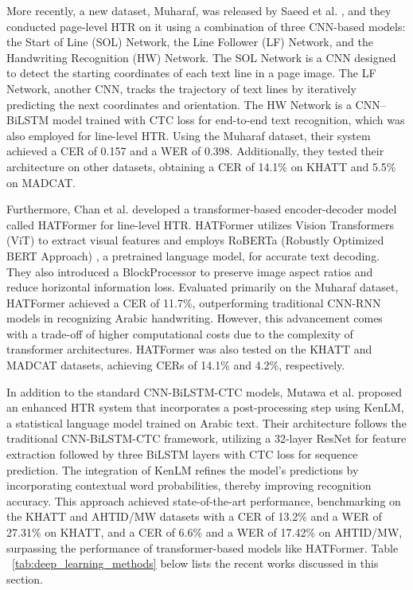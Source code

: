 \documentclass[conference]{IEEEtran}
\begin{document}
More recently, a new dataset, Muharaf, was released by  Saeed et al. \cite{saeed2024muharaf}, and they conducted page-level HTR on it using a combination of three CNN-based models: the Start of Line (SOL) Network, the Line Follower (LF) Network, and the Handwriting Recognition (HW) Network. The SOL Network is a CNN designed to detect the starting coordinates of each text line in a page image. The LF Network, another CNN, tracks the trajectory of text lines by iteratively predicting the next coordinates and orientation. The HW Network is a CNN–BiLSTM model trained with CTC loss for end-to-end text recognition, which was also employed for line-level HTR. Using the Muharaf dataset, their system achieved a CER of 0.157 and a WER of 0.398. Additionally, they tested their architecture on other datasets, obtaining a CER of 14.1\% on KHATT and 5.5\% on MADCAT.

Furthermore, Chan et al. \cite{chan2024hatformer} developed a transformer-based encoder-decoder model called HATFormer for line-level HTR. HATFormer utilizes Vision Transformers (ViT) \cite{}to extract visual features and employs RoBERTa (Robustly Optimized BERT Approach) \cite{}, a pretrained language model, for accurate text decoding. They also introduced a BlockProcessor to preserve image aspect ratios and reduce horizontal information loss. Evaluated primarily on the Muharaf dataset, HATFormer achieved a CER of 11.7\%, outperforming traditional CNN-RNN models in recognizing Arabic handwriting. However, this advancement comes with a trade-off of higher computational costs due to the complexity of transformer architectures. HATFormer was also tested on the KHATT and MADCAT datasets, achieving CERs of 14.1\% and 4.2\%, respectively.

In addition to the standard CNN-BiLSTM-CTC models, Mutawa et al. \cite{mutawa2024machine} proposed an enhanced HTR system that incorporates a post-processing step using KenLM, a statistical language model trained on Arabic text. Their architecture follows the traditional CNN-BiLSTM-CTC framework, utilizing a 32-layer ResNet for feature extraction followed by three BiLSTM layers with CTC loss for sequence prediction. The integration of KenLM refines the model's predictions by incorporating contextual word probabilities, thereby improving recognition accuracy. This approach achieved state-of-the-art performance, benchmarking on the KHATT and AHTID/MW datasets with a CER of 13.2\% and a WER of 27.31\% on KHATT, and a CER of 6.6\% and a WER of 17.42\% on AHTID/MW, surpassing the performance of transformer-based models like HATFormer. Table ~\ref{tab:deep_learning_methods} below lists the recent works discussed in this section.
\end{document}
